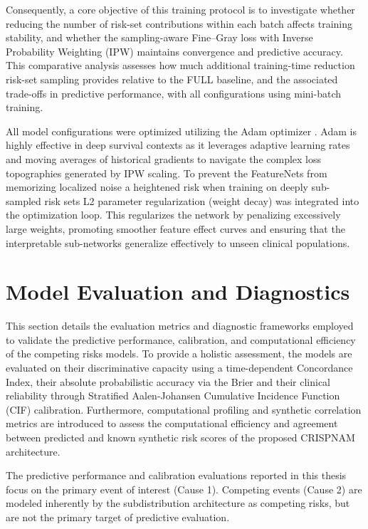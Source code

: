 \documentclass[a4paper,twoside,12pt]{report}
\begin{document}
Consequently, a core objective of this training protocol is to investigate whether reducing the number of risk-set contributions within each batch affects training stability, and whether the sampling-aware Fine--Gray loss with Inverse Probability Weighting (IPW) maintains convergence and predictive accuracy. This comparative analysis assesses how much additional training-time reduction risk-set sampling provides relative to the FULL baseline, and the associated trade-offs in predictive performance, with all configurations using mini-batch training.


All model configurations were optimized utilizing the Adam optimizer \citep{kingma2014adam}. Adam is highly effective in deep survival contexts as it leverages adaptive learning rates and moving averages of historical gradients to navigate the complex loss topographies generated by IPW scaling. To prevent the FeatureNets from memorizing localized noise a heightened risk when training on deeply sub-sampled risk sets L2 parameter regularization (weight decay) was integrated into the optimization loop. This regularizes the network by penalizing excessively large weights, promoting smoother feature effect curves and ensuring that the interpretable sub-networks generalize effectively to unseen clinical populations.



\section{Model Evaluation and Diagnostics}
This section details the evaluation metrics and diagnostic frameworks employed to validate the predictive performance, calibration, and computational efficiency of the competing risks models. To provide a holistic assessment, the models are evaluated on their discriminative capacity using a time-dependent Concordance Index, their absolute probabilistic accuracy via the Brier and their clinical reliability through Stratified Aalen-Johansen Cumulative Incidence Function (CIF) calibration. Furthermore, computational profiling and synthetic correlation metrics are introduced to assess the computational efficiency and agreement between predicted and known synthetic risk scores of the proposed CRISPNAM architecture.

The predictive performance and calibration evaluations reported in this thesis focus on the primary event of interest (Cause 1). Competing events (Cause 2) are modeled inherently by the subdistribution architecture as competing risks, but are not the primary target of predictive evaluation.
\end{document}
